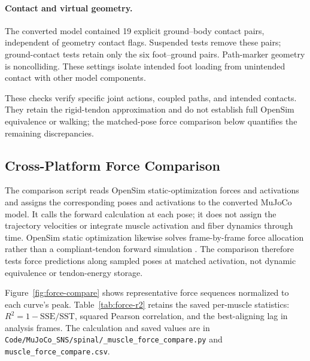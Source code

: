 \paragraph{Contact and virtual geometry.}
The converted model contained 19 explicit ground--body contact pairs, independent of geometry contact flags. Suspended tests remove these pairs; ground-contact tests retain only the six foot--ground pairs. Path-marker geometry is noncolliding. These settings isolate intended foot loading from unintended contact with other model components.

These checks verify specific joint actions, coupled paths, and intended contacts. They retain the rigid-tendon approximation and do not establish full OpenSim equivalence or walking; the matched-pose force comparison below quantifies the remaining discrepancies.


\subsection{Cross-Platform Force Comparison}
\label{sec:muscle-models-compare}

The comparison script reads OpenSim static-optimization forces and activations and assigns the corresponding poses and activations to the converted MuJoCo model. It calls the forward calculation at each pose; it does not assign the trajectory velocities or integrate muscle activation and fiber dynamics through time. OpenSim static optimization likewise solves frame-by-frame force allocation rather than a compliant-tendon forward simulation \citep{opensim_static_optimization_docs}. The comparison therefore tests force predictions along sampled poses at matched activation, not dynamic equivalence or tendon-energy storage.

Figure~\ref{fig:force-compare} shows representative force sequences normalized to each curve's peak. Table~\ref{tab:force-r2} retains the saved per-muscle statistics: $R^2=1-\mathrm{SSE}/\mathrm{SST}$, squared Pearson correlation, and the best-aligning lag in analysis frames. The calculation and saved values are in \nolinkurl{Code/MuJoCo_SNS/spinal/_muscle_force_compare.py} and \nolinkurl{muscle_force_compare.csv}.

